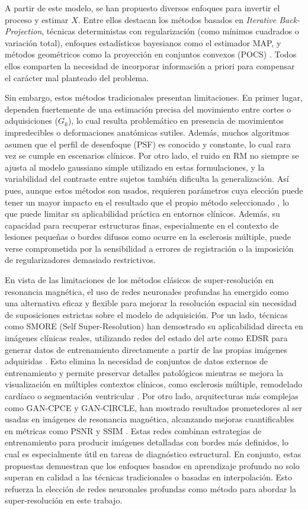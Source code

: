 \documentclass[../main.tex]{subfiles}
\begin{document}
A partir de este modelo, se han propuesto diversos enfoques para invertir el proceso y estimar $X$. Entre ellos destacan los métodos basados en \textit{Iterative Back-Projection}, técnicas deterministas con regularización (como mínimos cuadrados o variación total), enfoques estadísticos bayesianos como el estimador MAP, y métodos geométricos como la proyección en conjuntos convexos (POCS) \cite{sr_systematic_r}.
Todos ellos comparten la necesidad de incorporar información a priori para compensar el carácter mal planteado del problema.

Sin embargo, estos métodos tradicionales presentan limitaciones. En primer lugar, dependen fuertemente de una estimación precisa del movimiento entre cortes o adquisiciones ($G_k$), lo cual resulta problemático en presencia de movimientos impredecibles o deformaciones anatómicas sutiles. Además, muchos algoritmos asumen que el perfil de desenfoque (PSF) es conocido y constante, lo cual rara vez se cumple en escenarios clínicos. Por otro lado, el ruido en RM no siempre se ajusta al modelo gaussiano simple utilizado en estas formulaciones, y la variabilidad del contraste entre sujetos también dificulta la generalización. Así pues, aunque estos métodos son usados, requieren parámetros cuya elección puede tener un mayor impacto en el resultado que el propio método seleccionado \cite{sr_systematic_r}, lo que puede limitar su aplicabilidad práctica en entornos clínicos. Además, su capacidad para recuperar estructuras finas, especialmente en el contexto de lesiones pequeñas o bordes difusos como ocurre en la esclerosis múltiple, puede verse comprometida por la sensibilidad a errores de registración o la imposición de regularizadores demasiado restrictivos.

En vista de las limitaciones de los métodos clásicos de super-resolución en resonancia magnética, el uso de redes neuronales profundas ha emergido como una alternativa eficaz y flexible para mejorar la resolución espacial sin necesidad de suposiciones estrictas sobre el modelo de adquisición. 
Por un lado, técnicas como SMORE (Self Super-Resolution) han demostrado su aplicabilidad directa en imágenes clínicas reales, utilizando redes del estado del arte como EDSR para generar datos de entrenamiento directamente a partir de las propias imágenes adquiridas \cite{9253710}. Esto elimina la necesidad de conjuntos de datos externos de entrenamiento y permite preservar detalles patológicos mientras se mejora la visualización en múltiples contextos clínicos, como esclerosis múltiple, remodelado cardíaco o segmentación ventricular \cite{ZHAO2019132}. Por otro lado, arquitecturas más complejas como GAN-CPCE y GAN-CIRCLE, han mostrado resultados prometedores al ser usadas en imágenes de resonancia magnética, alcanzando mejoras cuantificables en métricas como PSNR y SSIM \cite{lyu2018super}. Estas redes combinan estrategias de entrenamiento para producir imágenes detalladas con bordes más definidos, lo cual es especialmente útil en tareas de diagnóstico estructural. En conjunto, estas propuestas demuestran que los enfoques basados en aprendizaje profundo no solo superan en calidad a las técnicas tradicionales o basadas en interpolación. Esto refuerza la elección de redes neuronales profundas como método para abordar la super-resolución en este trabajo.
\end{document}
